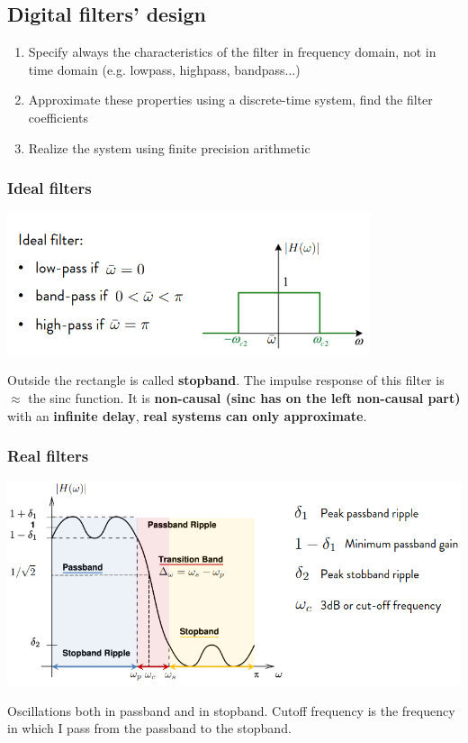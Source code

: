 \subsection{Digital filters' design}
\begin{enumerate}
    \item Specify always the characteristics of the filter in frequency domain, not in time domain (e.g. lowpass, highpass, bandpass...)
    \item Approximate these properties using a discrete-time system, find the filter coefficients
    \item Realize the system using finite precision arithmetic
\end{enumerate}

\subsubsection{Ideal filters}
\begin{center}
    \includegraphics[width=0.8\textwidth]{images/idealfilter.png}
\end{center}
Outside the rectangle is called \textbf{stopband}. The impulse response of this filter is $\approx$ the sinc function. It is \textbf{non-causal (sinc has on the left non-causal part)} with an \textbf{infinite delay}, \textbf{real systems can only approximate}.

\subsubsection{Real filters}
\begin{center}
    \includegraphics[width=1\textwidth]{images/realfilter.png}
\end{center}
Oscillations both in passband and in stopband. Cutoff frequency is the frequency in which I pass from the passband to the stopband.

